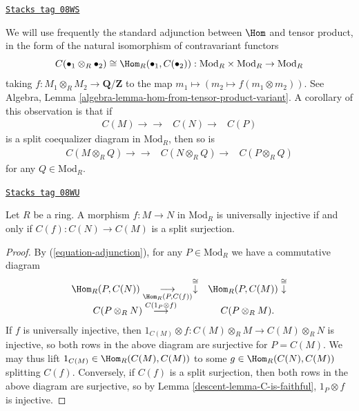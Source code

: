 \begin{remark}[Adjunction]
\label{descent-remark-adjunction}
\href{https://stacks.math.columbia.edu/tag/08WS}{\texttt{Stacks tag 08WS}}

We will use frequently the standard adjunction between $\Hom$ and tensor
product, in the form of the natural isomorphism of contravariant functors
\begin{equation}
\label{equation-adjunction}
C(\bullet_1 \otimes_R \bullet_2) \cong \Hom_R(\bullet_1, C(\bullet_2)):
\text{Mod}_R \times \text{Mod}_R \to \text{Mod}_R
\end{equation}
taking $f: M_1 \otimes_R M_2 \to \mathbf{Q}/\mathbf{Z}$ to the map $m_1 \mapsto
(m_2 \mapsto f(m_1 \otimes m_2))$. See
Algebra, Lemma \ref{algebra-lemma-hom-from-tensor-product-variant}.
A corollary of this observation is that if
$$
\begin{array}{ccc}C(M) \longrightarrow\longrightarrow & C(N) \longrightarrow & C(P)\end{array}
$$
is a split coequalizer diagram in $\text{Mod}_R$, then so is
$$
\begin{array}{ccc}C(M \otimes_R Q) \longrightarrow\longrightarrow & C(N \otimes_R Q) \longrightarrow & C(P
\otimes_R Q)\end{array}
$$
for any $Q \in \text{Mod}_R$.
\end{remark}

\begin{lemma}
\label{descent-lemma-split-surjection}
\href{https://stacks.math.columbia.edu/tag/08WU}{\texttt{Stacks tag 08WU}}

Let $R$ be a ring. A morphism $f: M \to N$ in $\text{Mod}_R$ is universally
injective if and only if $C(f): C(N) \to C(M)$ is a split surjection.
\end{lemma}

\begin{proof}

By (\ref{equation-adjunction}), for any $P \in \text{Mod}_R$ we have a
commutative diagram
$$
\begin{array}{cc}\Hom_R( P, C(N)) \underset{\Hom_R(P,C(f))}{\longrightarrow}\overset{\cong}{\downarrow} & \Hom_R(P,C(M)) \overset{\cong}{\downarrow} \\ C(P \otimes_R N ) \overset{C(1_{P} \otimes f)}{\longrightarrow} & C(P \otimes_R M ).\end{array}
$$
If $f$ is universally injective, then $1_{C(M)} \otimes f: C(M) \otimes_R M \to
C(M) \otimes_R N$ is injective,
so both rows in the above diagram are surjective for $P = C(M)$. We may thus
lift
$1_{C(M)} \in \Hom_R(C(M), C(M))$ to some $g \in \Hom_R(C(N), C(M))$ splitting
$C(f)$.
Conversely, if $C(f)$ is a split surjection, then
both rows in the above diagram are surjective,
so by Lemma \ref{descent-lemma-C-is-faithful}, $1_{P} \otimes f$ is injective.
\end{proof}

